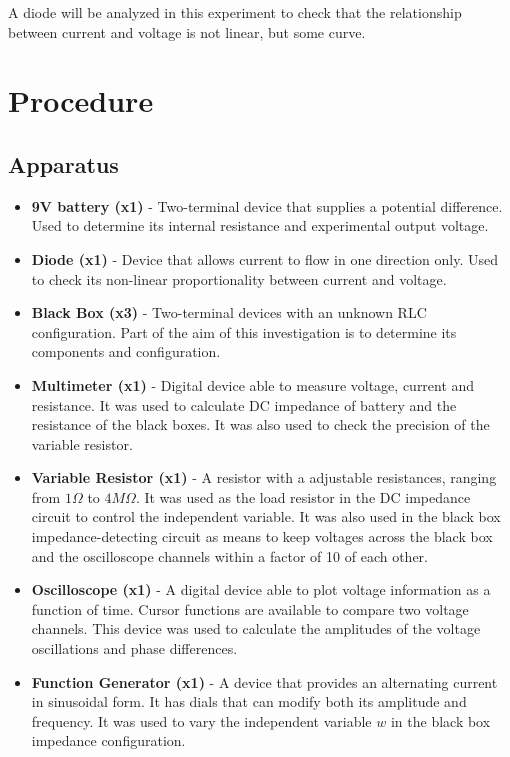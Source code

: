 \documentclass[a4paper]{article}
\begin{document}
A diode will be analyzed in this experiment to check that the relationship between current and voltage is not linear, but some curve.
\clearpage
\section{Procedure}
\subsection*{Apparatus}
\begin{itemize}
  \item \textbf{9V battery (x1)} - Two-terminal device that supplies a potential difference. Used to determine its internal resistance and experimental output voltage.
  \item \textbf{Diode (x1)} - Device that allows current to flow in one direction only. Used to check its non-linear proportionality between current and voltage.
  \item \textbf{Black Box (x3)} - Two-terminal devices with an unknown RLC configuration. Part of the aim of this investigation is to determine its components and configuration.
  \item \textbf{Multimeter (x1)} - Digital device able to measure voltage, current and resistance. It was used to calculate DC impedance of battery and the resistance of the black boxes. It was also used to check the precision of the variable resistor.
  \item \textbf{Variable Resistor (x1)} - A resistor with a adjustable resistances, ranging from $1\Omega$ to $4M\Omega$. It was used as the load resistor in the DC impedance circuit to control the independent variable. It was also used in the black box impedance-detecting circuit as means to keep voltages across the black box and the oscilloscope channels within a factor of 10 of each other.
  \item \textbf{Oscilloscope (x1)} - A digital device able to plot voltage information as a function of time. Cursor functions are available to compare two voltage channels. This device was used to calculate the amplitudes of the voltage oscillations and phase differences.
  \item \textbf{Function Generator (x1)} - A device that provides an alternating current in sinusoidal form. It has dials that can modify both its amplitude and frequency. It was used to vary the independent variable $w$ in the black box impedance configuration.
\end{itemize}
\end{document}
